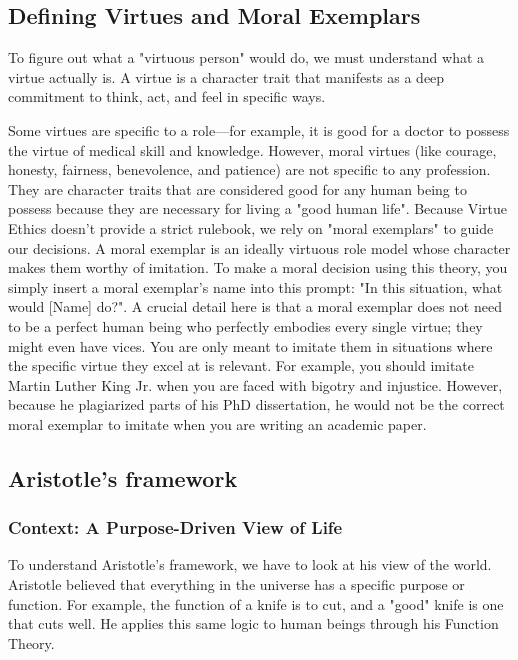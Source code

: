 \documentclass[12pt]{article}
\begin{document}
\subsection{Defining Virtues and Moral Exemplars}
To figure out what a "virtuous person" would do, we must understand what a virtue actually is.\newline
A virtue is a character trait that manifests as a deep commitment to think, act, and feel in specific ways.\newline

\smallskip
\noindent Some virtues are specific to a role—for example, it is good for a doctor to possess the virtue of medical skill and knowledge. However, moral virtues (like courage, honesty, fairness, benevolence, and patience) are not specific to any profession.
They are character traits that are considered good for any human being to possess because they are necessary for living a "good human life".\newline
Because Virtue Ethics doesn't provide a strict rulebook, we rely on "moral exemplars" to guide our decisions. A moral exemplar is an ideally virtuous role model whose character makes them worthy of imitation.\newline
To make a moral decision using this theory, you simply insert a moral exemplar's name into this prompt: "In this situation, what would [Name] do?".
A crucial detail here is that a moral exemplar does not need to be a perfect human being who perfectly embodies every single virtue; they might even have vices. You are only meant to imitate them in situations where the specific virtue they excel at is relevant.\newline
For example, you should imitate Martin Luther King Jr. when you are faced with bigotry and injustice. However, because he plagiarized parts of his PhD dissertation, he would not be the correct moral exemplar to imitate when you are writing an academic paper.

\subsection{Aristotle's framework}
\subsubsection{Context: A Purpose-Driven View of Life}
To understand Aristotle's framework, we have to look at his view of the world. Aristotle believed that everything in the universe has a specific purpose or function. For example, the function of a knife is to cut, and a "good" knife is one that cuts well.
He applies this same logic to human beings through his Function Theory.
\end{document}
